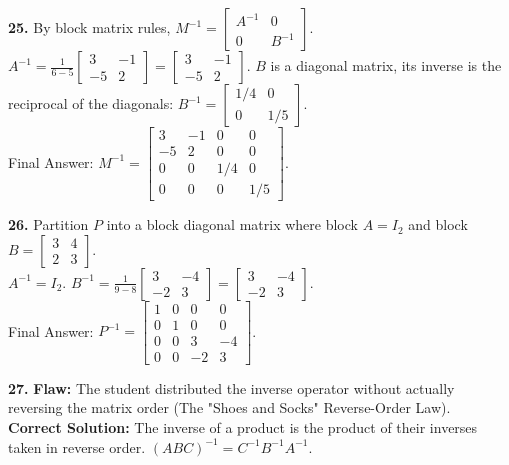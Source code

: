 \documentclass{article}
\begin{document}
\vspace{5pt}
\noindent
\textbf{25.} By block matrix rules, $M^{-1} = \begin{bmatrix} A^{-1} & 0 \\ 0 & B^{-1} \end{bmatrix}$. \\
$A^{-1} = \frac{1}{6-5}\begin{bmatrix} 3 & -1 \\ -5 & 2 \end{bmatrix} = \begin{bmatrix} 3 & -1 \\ -5 & 2 \end{bmatrix}$. $B$ is a diagonal matrix, its inverse is the reciprocal of the diagonals: $B^{-1} = \begin{bmatrix} 1/4 & 0 \\ 0 & 1/5 \end{bmatrix}$. \\
Final Answer: $M^{-1} = \begin{bmatrix} 3 & -1 & 0 & 0 \\ -5 & 2 & 0 & 0 \\ 0 & 0 & 1/4 & 0 \\ 0 & 0 & 0 & 1/5 \end{bmatrix}$.

\vspace{5pt}
\noindent
\textbf{26.} Partition $P$ into a block diagonal matrix where block $A = I_2$ and block $B = \begin{bmatrix} 3 & 4 \\ 2 & 3 \end{bmatrix}$. \\
$A^{-1} = I_2$. $B^{-1} = \frac{1}{9-8} \begin{bmatrix} 3 & -4 \\ -2 & 3 \end{bmatrix} = \begin{bmatrix} 3 & -4 \\ -2 & 3 \end{bmatrix}$. \\
Final Answer: $P^{-1} = \begin{bmatrix} 1 & 0 & 0 & 0 \\ 0 & 1 & 0 & 0 \\ 0 & 0 & 3 & -4 \\ 0 & 0 & -2 & 3 \end{bmatrix}$.

\vspace{5pt}
\noindent
\textbf{27.} \textbf{Flaw:} The student distributed the inverse operator without actually reversing the matrix order (The "Shoes and Socks" Reverse-Order Law). \\
\textbf{Correct Solution:} The inverse of a product is the product of their inverses taken in reverse order. $(ABC)^{-1} = C^{-1} B^{-1} A^{-1}$.
\end{document}
